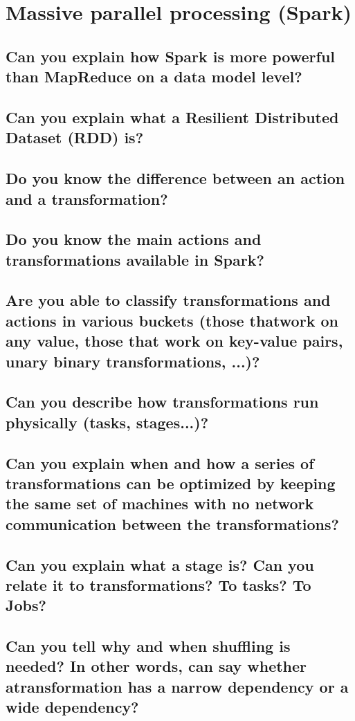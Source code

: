 \documentclass{article}
\begin{document}
\pagebreak

\section{Massive parallel processing (Spark)}
\subsection{Can you explain how Spark is more powerful than MapReduce on a data model level?}
\subsection{Can you explain what a Resilient Distributed Dataset (RDD) is?}
\subsection{Do you know the difference between an action and a transformation?}
\subsection{Do you know the main actions and transformations available in Spark?}
\subsection{Are you able to classify transformations and actions in various buckets (those thatwork on any value, those that work on key-value pairs, unary binary transformations, ...)?}
\subsection{Can you describe how transformations run physically (tasks, stages...)?}
\subsection{Can you explain when and how a series of transformations can be optimized by keeping the same set of machines with no network communication between the transformations?}
\subsection{Can you explain what a stage is? Can you relate it to transformations? To tasks? To Jobs?}
\subsection{Can you tell why and when shuffling is needed? In other words, can say whether atransformation has a narrow dependency or a wide dependency?}
\end{document}
